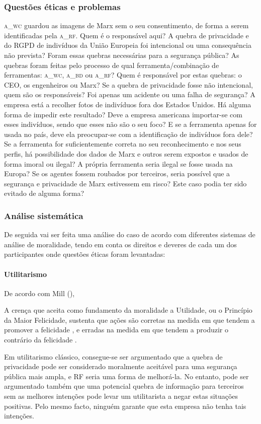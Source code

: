 \documentclass[12pt]{../diazessay}
\begin{document}
\subsubsection*{Questões éticas e problemas}
\textsc{a\_wc} guardou as imagens de Marx sem o seu consentimento, de forma a serem identificadas pela \textsc{a\_rf}. Quem é o responsável aqui? A quebra de privacidade e do RGPD de indivíduos da União Europeia foi intencional ou uma consequência não prevista? Foram essas quebras necessárias para a segurança pública? As quebras foram feitas pelo processo de qual ferramenta/combinação de ferramentas: \textsc{a\_wc}, \textsc{a\_bd} ou \textsc{a\_rf}? Quem é responsável por estas quebras: o CEO, os engenheiros ou Marx? Se a quebra de privacidade fosse não intencional, quem são os responsáveis? Foi apenas um acidente ou uma falha de segurança? A empresa está a recolher fotos de indivíduos fora dos Estados Unidos. Há alguma forma de impedir este resultado? Deve a empresa americana importar-se com esses indivíduos, sendo que esses não são o seu foco? E se a ferramenta apenas for usada no país, deve ela preocupar-se com a identificação de indivíduos fora dele? Se a ferramenta for suficientemente correta no seu reconhecimento e nos seus perfis, há possibilidade dos dados de Marx e outros serem expostos e usados de forma imoral ou ilegal? A própria ferramenta seria ilegal se fosse usada na Europa? Se os agentes fossem roubados por terceiros, seria possível que a segurança e privacidade de Marx estivessem em risco? Este caso podia ter sido evitado de alguma forma?
\subsubsection*{Análise sistemática}
De seguida vai ser feita uma análise do caso de acordo com diferentes sistemas de análise de moralidade, tendo em conta os direitos e deveres de cada um dos participantes onde questões éticas foram levantadas:
\paragraph{Utilitarismo}
De acordo com Mill (\citeyear{mill}), 
\begin{displayquote}
  A crença que aceita como fundamento da moralidade a Utilidade, ou o Princípio da Maior Felicidade, sustenta que ações são corretas na medida em que tendem a promover a felicidade , e erradas na medida em que tendem a produzir o contrário da felicidade .
\end{displayquote}
Em utilitarismo clássico, consegue-se ser argumentado que a quebra de privacidade pode ser considerado moralmente aceitável para uma segurança pública mais ampla, e RF seria uma forma de melhorá-la. No entanto, pode ser argumentado também que uma potencial quebra de informação para terceiros sem as melhores intenções pode levar um utilitarista a negar estas situações positivas. Pelo mesmo facto, ninguém garante que esta empresa não tenha tais intenções.
\end{document}
